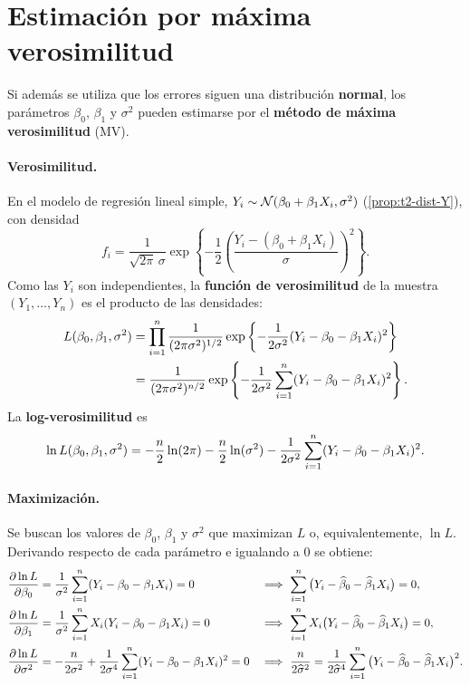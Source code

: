 \section{Estimación por máxima verosimilitud}
\label{sec:t2-mv}

Si además se utiliza que los errores siguen una distribución \textbf{normal}, los parámetros
$\beta_0$, $\beta_1$ y $\sigma^2$ pueden estimarse por el \textbf{método de máxima
verosimilitud} (MV).

\paragraph{Verosimilitud.} En el modelo de regresión lineal simple,
$Y_i\sim\mathcal{N}(\beta_0+\beta_1X_i,\sigma^2)$ (\cref{prop:t2-dist-Y}), con densidad
\[
  f_i = \frac{1}{\sqrt{2\pi}\,\sigma}
        \exp\left\{-\frac12\left(\frac{Y_i-(\beta_0+\beta_1X_i)}{\sigma}\right)^2\right\}.
\]
Como las $Y_i$ son independientes, la \textbf{función de verosimilitud} de la muestra
$(Y_1,\ldots,Y_n)$ es el producto de las densidades:
\begin{align*}
  L(\beta_0,\beta_1,\sigma^2)
  &= \prod_{i=1}^{n} \frac{1}{(2\pi\sigma^2)^{1/2}}
     \exp\left\{-\frac{1}{2\sigma^2}(Y_i-\beta_0-\beta_1X_i)^2\right\} \\
  &= \frac{1}{(2\pi\sigma^2)^{n/2}}
     \exp\left\{-\frac{1}{2\sigma^2}\sum_{i=1}^{n} (Y_i-\beta_0-\beta_1X_i)^2\right\}.
\end{align*}
La \textbf{log-verosimilitud} es
\[
  \ln L(\beta_0,\beta_1,\sigma^2)
  = -\frac{n}{2}\ln(2\pi) - \frac{n}{2}\ln(\sigma^2)
    - \frac{1}{2\sigma^2}\sum_{i=1}^{n} (Y_i-\beta_0-\beta_1X_i)^2 .
\]

\paragraph{Maximización.} Se buscan los valores de $\beta_0$, $\beta_1$ y $\sigma^2$ que
maximizan $L$ o, equivalentemente, $\ln L$. Derivando respecto de cada parámetro e igualando a
0 se obtiene:
\begin{align*}
  \frac{\partial \ln L}{\partial\beta_0} &= \frac{1}{\sigma^2}\sum_{i=1}^{n} (Y_i-\beta_0-\beta_1X_i) = 0
  &&\Longrightarrow\ \sum_{i=1}^{n} \big(Y_i-\widehat{\beta}_0-\widehat{\beta}_1X_i\big) = 0, \\
  \frac{\partial \ln L}{\partial\beta_1} &= \frac{1}{\sigma^2}\sum_{i=1}^{n} X_i(Y_i-\beta_0-\beta_1X_i) = 0
  &&\Longrightarrow\ \sum_{i=1}^{n} X_i\big(Y_i-\widehat{\beta}_0-\widehat{\beta}_1X_i\big) = 0, \\
  \frac{\partial \ln L}{\partial\sigma^2} &= -\frac{n}{2\sigma^2}
     + \frac{1}{2\sigma^4}\sum_{i=1}^{n} (Y_i-\beta_0-\beta_1X_i)^2 = 0
  &&\Longrightarrow\ \frac{n}{2\widehat{\sigma}^2}
     = \frac{1}{2\widehat{\sigma}^4}\sum_{i=1}^{n} \big(Y_i-\widehat{\beta}_0-\widehat{\beta}_1X_i\big)^2 .
\end{align*}

